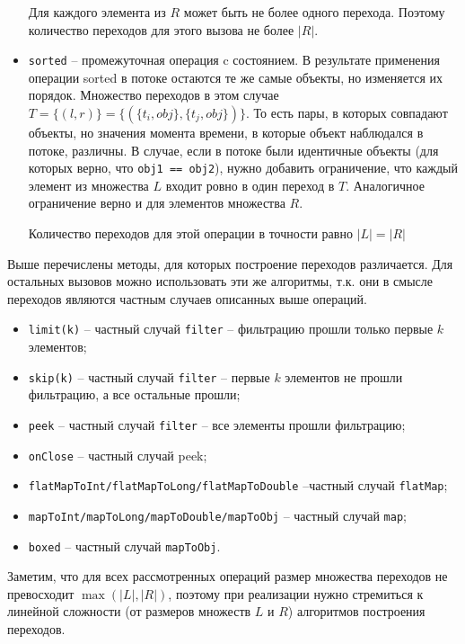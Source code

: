 \begin{itemize}
	Для каждого элемента из $R$ может быть не более одного перехода. Поэтому количество переходов для этого вызова не более $|R|$.
	\item \texttt{sorted} -- промежуточная операция c состоянием. В результате применения операции sorted в потоке остаются те же самые объекты, но изменяется их порядок. Множество переходов в этом случае $T = \{(l, r)\} = \{(\{t_i, obj\}, \{t_j, obj\})\}$. То есть пары, в которых совпадают объекты, но значения момента времени, в которые объект наблюдался в потоке, различны. В случае, если в потоке были идентичные объекты (для которых верно, что \texttt{obj1 == obj2}), нужно добавить ограничение, что каждый элемент из множества $L$ входит ровно в один переход в $T$. Аналогичное ограничение верно и для элементов множества $R$.
	
	Количество переходов для этой операции в точности равно $|L| = |R|$
\end{itemize}

Выше перечислены методы, для которых построение переходов различается. Для остальных вызовов можно использовать эти же алгоритмы, т.к. они в смысле переходов являются частным случаев описанных выше операций.
\begin{itemize}
	\item \texttt{limit(k)} -- частный случай \texttt{filter} -- фильтрацию прошли только первые $k$ элементов;
	\item \texttt{skip(k)} -- частный случай \texttt{filter} -- первые $k$ элементов не прошли фильтрацию, а все остальные прошли;
	\item \texttt{peek} -- частный случай \texttt{filter} -- все элементы прошли фильтрацию;
	\item \texttt{onClose} -- частный случай peek;
	\item \texttt{flatMapToInt/flatMapToLong/flatMapToDouble} --частный случай \texttt{flatMap};
	\item \texttt{mapToInt/mapToLong/mapToDouble/mapToObj} -- частный случай \texttt{map};
	\item \texttt{boxed} -- частный случай \texttt{mapToObj}.
\end{itemize}  

Заметим, что для всех рассмотренных операций размер множества переходов не превосходит $\max(|L|, |R|)$, поэтому при реализации нужно стремиться к линейной сложности (от размеров множеств $L$ и $R$) алгоритмов построения переходов.

